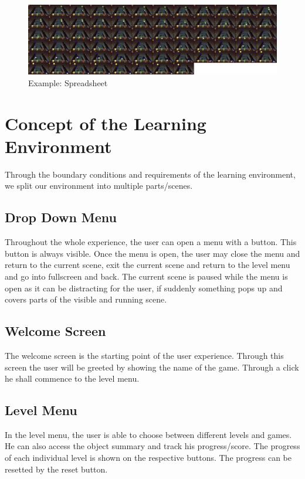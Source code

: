 \begin{figure}[H]
    \centering
    \includegraphics[width=1\textwidth]{figures/spreadsheet}
    \caption{Example: Spreadsheet}
    \label{fig:spreadsheet}
\end{figure}

\section{Concept of the Learning Environment}\label{sec:concept-of-the-learning-environment}
Through the boundary conditions and requirements of the learning environment,
we split our environment into multiple parts/scenes.

\subsection{Drop Down Menu}\label{subsec:drop-down-menu}
Throughout the whole experience, the user can open a menu with a button.
This button is always visible.
Once the menu is open, the user may close the menu and return to the current scene,
exit the current scene and return to the level menu and go into fullscreen and back.
The current scene is paused while the menu is open as it can be distracting for the user,
if suddenly something pops up and covers parts of the visible and running scene.

\subsection{Welcome Screen}\label{subsec:welcome-screen}
The welcome screen is the starting point of the user experience.
Through this screen the user will be greeted by showing the name of the game.
Through a click he shall commence to the level menu.

\subsection{Level Menu}\label{subsec:level-menu}
In the level menu, the user is able to choose between different levels and games.
He can also access the object summary and track his progress/score.
The progress of each individual level is shown on the respective buttons.
The progress can be resetted by the reset button.

